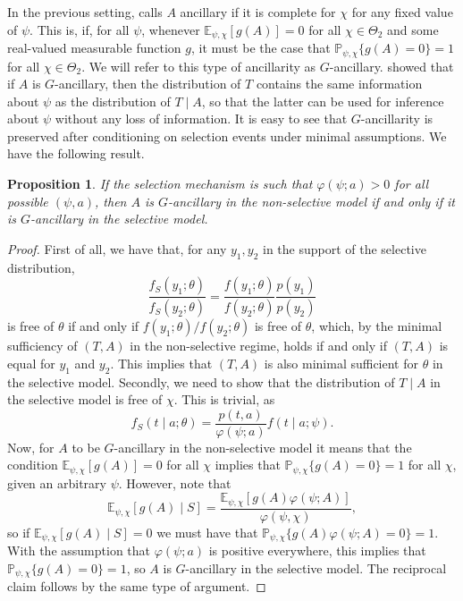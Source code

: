 \documentclass[pdflatex,sn-chicago]{sn-jnl}%
\theoremstyle{thmstyleone}%
\newtheorem{proposition}[theorem]{Proposition}%
\theoremstyle{thmstyletwo}%
\theoremstyle{thmstylethree}%
\begin{document}
In the previous setting, \cite{Godambe1} calls $A$ ancillary if it is complete for $\chi$ for any fixed value of $\psi$. This is, if, for all $\psi$, whenever $\mathbb{E}_{\psi, \chi}[g(A)] = 0$ for all $\chi \in \Theta_2$ and some real-valued measurable function $g$, it must be the case that $\mathbb{P}_{\psi, \chi}\{g(A) = 0\} = 1$ for all $\chi\in \Theta_2$. We will refer to this type of ancillarity as $G$-ancillary. \cite{Godambe2} showed that if $A$ is $G$-ancillary, then the distribution of $T$ contains the same information about $\psi$ as the distribution of $T\mid A$, so that the latter can be used for inference about $\psi$ without any loss of information. It is easy to see that $G$-ancillarity is preserved after conditioning on selection events under minimal assumptions. We have the following result.
\begin{proposition}\label{PROP: godambe}
If the selection mechanism is such that $\varphi(\psi; a) > 0$ for all possible $(\psi, a)$, then $A$ is $G$-ancillary in the non-selective model if and only if it is $G$-ancillary in the selective model.
\end{proposition} 
\begin{proof}
First of all, we have that, for any $y_1, y_2$ in the support of the selective distribution,
\begin{equation*}
\frac{f_S(y_1 ; \theta )}{f_S(y_2; \theta )} = \frac{f(y_1; \theta )}{f(y_2; \theta )}\frac{p(y_1)}{p(y_2)} 
\end{equation*}
is free of $\theta$ if and only if $f(y_1; \theta )/f(y_2; \theta )$ is free of $\theta$, which, by the minimal sufficiency of $(T, A)$ in the non-selective regime, holds if and only if $(T, A)$ is equal for $y_1$ and $y_2$. This implies that $(T, A)$ is also minimal sufficient for $\theta$ in the selective model. Secondly, we need to show that the distribution of $T\mid A$ in the selective model is free of $\chi$. This is trivial, as
\begin{equation*}\label{EQ: reducedconditionalmodel2}
f_{S}(t \mid  a ; \theta ) = \frac{p(t, a)}{\varphi(\psi;a)}   f(t\mid a; \psi).
\end{equation*}
Now, for $A$ to be $G$-ancillary in the non-selective model it means that the condition $\mathbb{E}_{\psi, \chi}[g(A)] = 0$ for all $\chi$ implies that $\mathbb{P}_{\psi, \chi}\{g(A) = 0\} = 1$ for all $\chi$, given an arbitrary $\psi$. However, note that 
\begin{equation*}
\mathbb{E}_{\psi, \chi}[g(A)\mid S] = \frac{\mathbb{E}_{\psi, \chi}[g(A)\varphi(\psi; A)]}{\varphi(\psi, \chi)},
\end{equation*}
so if $\mathbb{E}_{\psi, \chi}[g(A)\mid S] = 0$ we must have that $\mathbb{P}_{\psi, \chi}\{ g(A)\varphi(\psi; A) = 0\} = 1$. With the assumption that $\varphi(\psi; a) $ is positive everywhere, this implies that $\mathbb{P}_{\psi, \chi}\{ g(A) = 0\} = 1$, so $A$ is $G$-ancillary in the selective model. The reciprocal claim follows by the same type of argument.
\end{proof}
\end{document}

